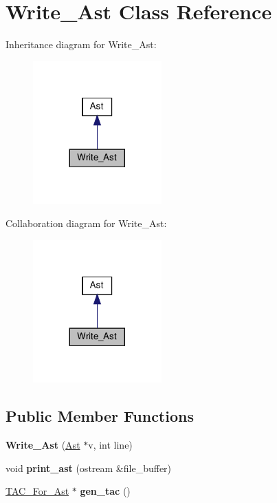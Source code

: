 \hypertarget{classWrite__Ast}{}\section{Write\+\_\+\+Ast Class Reference}
\label{classWrite__Ast}


Inheritance diagram for Write\+\_\+\+Ast\+:
\nopagebreak
\begin{figure}[H]
\begin{center}
\leavevmode
\includegraphics[width=140pt]{classWrite__Ast__inherit__graph}
\end{center}
\end{figure}


Collaboration diagram for Write\+\_\+\+Ast\+:
\nopagebreak
\begin{figure}[H]
\begin{center}
\leavevmode
\includegraphics[width=140pt]{classWrite__Ast__coll__graph}
\end{center}
\end{figure}
\subsection*{Public Member Functions}
\begin{DoxyCompactItemize}
\item 
\mbox{\label{classWrite__Ast_a7b18d045a3b3e11c0d8e56f63f755c64}} 
{\bfseries Write\+\_\+\+Ast} (\hyperlink{classAst}{Ast} $\ast$v, int line)
\item 
\mbox{\label{classWrite__Ast_ae6d4bc005f7e9933c6db56cd463cc22c}} 
void {\bfseries print\+\_\+ast} (ostream \&file\+\_\+buffer)
\item 
\mbox{\label{classWrite__Ast_a5bbc7537509340a0171cac5f0c74f7c8}} 
\hyperlink{classTAC__For__Ast}{T\+A\+C\+\_\+\+For\+\_\+\+Ast} $\ast$ {\bfseries gen\+\_\+tac} ()
\end{DoxyCompactItemize}
